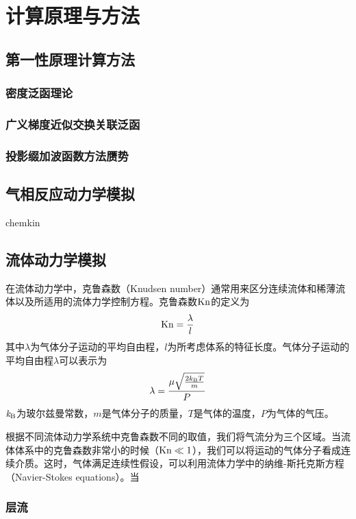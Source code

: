\chapter{计算原理与方法}
\section{第一性原理计算方法}
\subsection{密度泛函理论}
\subsection{广义梯度近似交换关联泛函}
\subsection{投影缀加波函数方法赝势}

\section{气相反应动力学模拟}
chemkin
\section{流体动力学模拟}
    在流体动力学中，克鲁森数（Knudsen number）通常用来区分连续流体和稀薄流体以及所适用的流体力学控制方程。克鲁森数$\rm Kn$的定义为\chinesecolon
    \begin{equation}
        {\rm Kn}=\frac{\lambda}{l}
    \end{equation}
    其中$\lambda$为气体分子运动的平均自由程\chinesecolon，$l$为所考虑体系的特征长度。气体分子运动的平均自由程$\lambda$可以表示为\chinesecolon
    \begin{equation}
        \lambda=\frac{\mu \sqrt{\frac{2k_{\rm B}T}{m}}}{P}
    \end{equation}
    $\it k_{\rm B} \it$为玻尔兹曼常数，$m$是气体分子的质量，$T$是气体的温度，$P$为气体的气压。

    根据不同流体动力学系统中克鲁森数不同的取值，我们将气流分为三个区域。当流体体系中的克鲁森数非常小的时候（${\rm Kn}\ll 1$），我们可以将运动的气体分子看成连续介质。这时，气体满足连续性假设，可以利用流体力学中的纳维-斯托克斯方程（Navier-Stokes equations）。当
    \subsection{层流}
